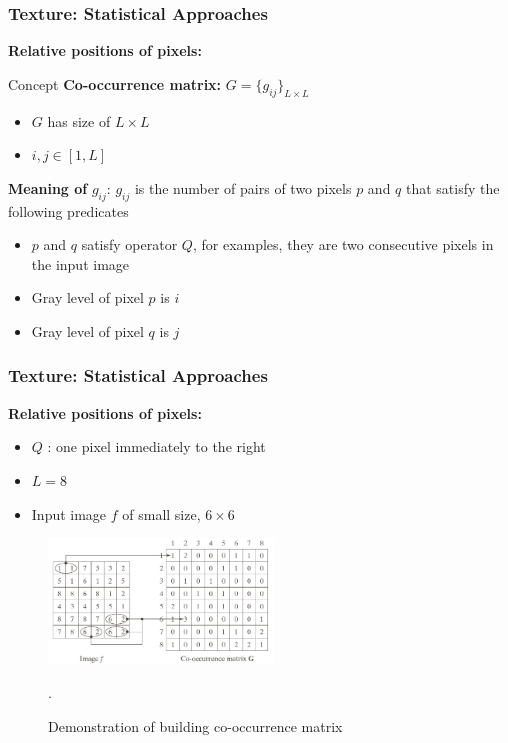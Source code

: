 \documentclass[english,11pt,table,handout]{beamer}
\begin{document}
\frame
{
	\frametitle{Texture: Statistical Approaches}
	\large
	\textbf{Relative positions of pixels: }
	\newline
	
	\begin{block}{Concept}
		\textbf{Co-occurrence matrix:} $G = \{g_{ij}\}_{L \times L}$
			\begin{itemize}
				\item $G$ has size of $L \times L$
				\item $i, j \in [1, L]$
			\end{itemize}
		\textbf{Meaning of} $g_{ij}$: $g_{ij}$ is the number of pairs of two pixels $p$ and $q$ that satisfy the following predicates
			\begin{itemize}
				\item $p$ and $q$ satisfy operator $Q$, for examples, they are two consecutive pixels in the input image
				\item Gray level of pixel $p$ is $i$
				\item Gray level of pixel $q$ is $j$
			\end{itemize}
		
	\end{block}
}

\frame
{
	\frametitle{Texture: Statistical Approaches}
	\large
	\textbf{Relative positions of pixels: }
	\newline
	
	\begin{examples}
		\begin{itemize}
			\item $Q$ : one pixel immediately to the right
			\item $L = 8$
			\item Input image $f$ of small size, $6 \times 6$
		\end{itemize}
		\begin{figure}[!h]
			\includegraphics[width=6cm]{texture_3.png}
			\caption{Demonstration of building co-occurrence matrix }. 
		\end{figure}
	\end{examples}
}
\end{document}
